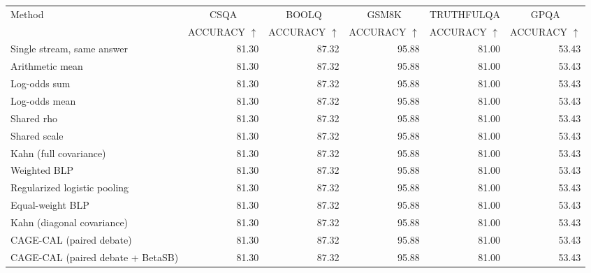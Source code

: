\begin{tabular}{lrrrrr}
\toprule
Method & \multicolumn{1}{c}{CSQA} & \multicolumn{1}{c}{BOOLQ} & \multicolumn{1}{c}{GSM8K} & \multicolumn{1}{c}{TRUTHFULQA} & \multicolumn{1}{c}{GPQA} \\
 & ACCURACY $\uparrow$ & ACCURACY $\uparrow$ & ACCURACY $\uparrow$ & ACCURACY $\uparrow$ & ACCURACY $\uparrow$ \\
\midrule
Single stream, same answer & 81.30 & 87.32 & 95.88 & 81.00 & 53.43 \\
Arithmetic mean & 81.30 & 87.32 & 95.88 & 81.00 & 53.43 \\
Log-odds sum & 81.30 & 87.32 & 95.88 & 81.00 & 53.43 \\
Log-odds mean & 81.30 & 87.32 & 95.88 & 81.00 & 53.43 \\
Shared rho & 81.30 & 87.32 & 95.88 & 81.00 & 53.43 \\
Shared scale & 81.30 & 87.32 & 95.88 & 81.00 & 53.43 \\
Kahn (full covariance) & 81.30 & 87.32 & 95.88 & 81.00 & 53.43 \\
Weighted BLP & 81.30 & 87.32 & 95.88 & 81.00 & 53.43 \\
Regularized logistic pooling & 81.30 & 87.32 & 95.88 & 81.00 & 53.43 \\
Equal-weight BLP & 81.30 & 87.32 & 95.88 & 81.00 & 53.43 \\
Kahn (diagonal covariance) & 81.30 & 87.32 & 95.88 & 81.00 & 53.43 \\
CAGE-CAL (paired debate) & 81.30 & 87.32 & 95.88 & 81.00 & 53.43 \\
CAGE-CAL (paired debate + BetaSB) & 81.30 & 87.32 & 95.88 & 81.00 & 53.43 \\
\bottomrule
\end{tabular}
